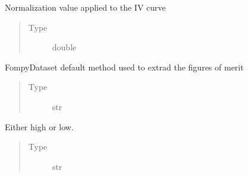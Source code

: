 \documentclass[letterpaper,10pt,english,openany, oneside]{sphinxmanual}
\begin{document}
\begin{fulllineitems}
\begin{fulllineitems}
\end{fulllineitems}


\begin{fulllineitems}
\label{\detokenize{index:fompy.fds.FompyDataset.norm}}
Normalization value applied to the IV curve
\begin{quote}\begin{description}
\item[{Type}] \leavevmode
double

\end{description}\end{quote}

\end{fulllineitems}


\begin{fulllineitems}
\label{\detokenize{index:fompy.fds.FompyDataset.ext_method}}
FompyDataset default method used to extrad the figures of merit
\begin{quote}\begin{description}
\item[{Type}] \leavevmode
str

\end{description}\end{quote}

\end{fulllineitems}


\begin{fulllineitems}
\label{\detokenize{index:fompy.fds.FompyDataset.drain_bias_label}}
Either high or low.
\begin{quote}\begin{description}
\item[{Type}] \leavevmode
str

\end{description}\end{quote}

\end{fulllineitems}



\end{fulllineitems}
\end{document}
